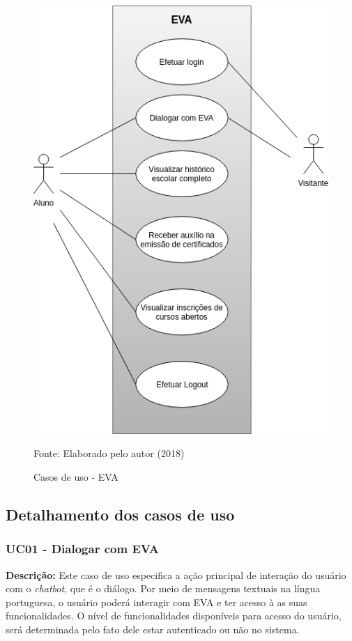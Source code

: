 \begin{figure}[htb!]
    \centering
    \includegraphics[width=0.2\linewidth]{src/imagens/CasoDeUsoEva.png}
    \caption{Casos de uso - EVA} Fonte: Elaborado pelo autor (2018)
    \label{cap:03:fig:diagrama}
\end{figure}

\subsection{Detalhamento dos casos de uso}\label{cap3-detalhamento-casos-de-uso}

\subsubsection{UC01 - Dialogar com EVA}
\textbf{Descrição:} Este caso de uso especifica a ação principal de interação do usuário com o \textit{chatbot}, que é o diálogo. Por meio de mensagens textuais na língua portuguesa, o usuário poderá interagir com EVA e ter acesso à as suas funcionalidades. O nível de funcionalidades disponíveis para acesso do usuário, será determinada pelo fato dele estar autenticado ou não no sistema.

